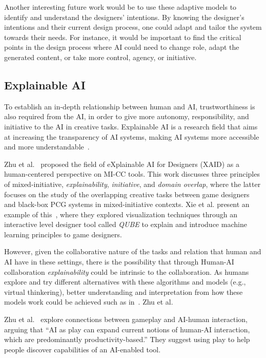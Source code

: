 Another interesting future work would be to use these adaptive models to identify and understand the designers' intentions. By knowing the designer's intentions and their current design process, one could adapt and tailor the system towards their needs. For instance, it would be important to find the critical points in the design process where AI could need to change role, adapt the generated content, or take more control, agency, or initiative.


\subsection{Explainable AI}

To establish an in-depth relationship between human and AI, trustworthiness is also required from the AI, in order to give more autonomy, responsibility, and initiative to the AI in creative tasks. Explainable AI is a research field that aims at increasing the transparency of AI systems, making AI systems more accessible and more understandable~\cite{adadi_peeking_2018,doshi-velez_considerations_2018}.

Zhu et al.~\cite{zhu_explainable_2018} proposed the field of eXplainable AI for Designers (XAID) as a human-centered perspective on MI-CC tools. This work discusses three principles of mixed-initiative, \emph{explainability}, \emph{initiative}, and \emph{domain overlap}, where the latter focuses on the study of the overlapping creative tasks between game designers and black-box PCG systems in mixed-initiative contexts. Xie et al. present an example of this~\cite{xie_interactive_2019}, where they explored visualization techniques through an interactive level designer tool called \textit{QUBE} to explain and introduce machine learning principles to game designers.

However, given the collaborative nature of the tasks and relation that human and AI have in these settings, there is the possibility that through Human-AI collaboration \emph{explainability} could be intrinsic to the collaboration. As humans explore and try different alternatives with these algorithms and models (e.g., virtual thinkering), better understanding and interpretation from how these models work could be achieved such as in~\cite{xie_interactive_2019}. Zhu et al.~\cite{zhu_player-ai_2021}

Zhu et al.~\cite{zhu_player-ai_2021} explore connections between gameplay and AI-human interaction, arguing that “AI as play can expand current notions of human-AI interaction, which are predominantly productivity-based.” They suggest using play to help people discover capabilities of an AI-enabled tool.

